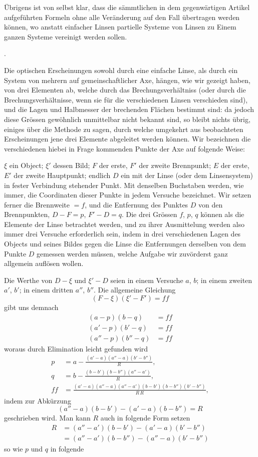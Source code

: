 \documentclass[11pt,a4paper]{article}
\begin{document}
Übrigens ist von selbst klar, dass die sämmtlichen in dem gegenwärtigen Artikel aufgeführten Formeln ohne alle Veränderung auf den Fall übertragen werden können, wo anstatt einfacher Linsen partielle Systeme von Linsen zu Einem ganzen Systeme vereinigt werden sollen.

\bigskip{}.

\smallskip
Die optischen Erscheinungen sowohl durch eine einfache Linse, als durch ein System von mehrern auf gemeinschaftlicher Axe, hängen, wie wir gezeigt haben, von drei Elementen ab, welche durch das Brechungsverhältniss (oder durch die Brechungsverhältnisse, wenn sie für die verschiedenen Linsen verschieden sind), und die Lagen und Halbmesser der brechenden Flächen bestimmt sind: da jedoch diese Grössen gewöhnlich unmittelbar nicht bekannt sind, so bleibt nichts übrig, einiges über die Methode zu sagen, durch welche umgekehrt aus beobachteten Erscheinungen jene drei Elemente abgeleitet werden können. Wir bezeichnen die verschiedenen hiebei in Frage kommenden Punkte der Axe auf folgende Weise:

$\xi$ ein Object; $\xi'$ dessen Bild; $F$ der erste, $F'$ der zweite Brennpunkt; $E$ der erste, $E'$ der zweite Hauptpunkt; endlich $D$ ein mit der Linse (oder dem Linsensystem) in fester Verbindung stehender Punkt. Mit denselben Buchstaben werden, wie immer, die Coordinaten dieser Punkte in jedem Versuche bezeichnet. Wir setzen ferner die Brennweite $= f$, und die Entfernung des Punktes $D$ von den Brennpunkten, $D - F = p$, $F' - D = q$. Die drei Grössen $f$, $p$, $q$ können als die Elemente der Linse betrachtet werden, und zu ihrer Ausmittelung werden also immer drei Versuche erforderlich sein, indem in drei verschiedenen Lagen des Objects und seines Bildes gegen die Linse die Entfernungen derselben von dem Punkte $D$ gemessen werden müssen, welche Aufgabe wir zuvörderst ganz allgemein auflösen wollen.

Die Werthe von $D - \xi$ und $\xi' - D$ seien in einem Versuche $a$, $b$; in einem zweiten $a'$, $b'$; in einem dritten $a''$, $b''$. Die allgemeine Gleichung
\[
(F - \xi)(\xi' - F') = ff
\]
gibt uns demnach
\begin{align*}
(a - p)(b - q) &= ff \\
(a' - p)(b' - q) &= ff \\
(a'' - p)(b'' - q) &= ff
\end{align*}
woraus durch Elimination leicht gefunden wird
\begin{align*}
p &= a - \frac{(a' - a)(a'' - a)(b' - b'')}{R}, \\
q &= b - \frac{(b - b')(b - b'')(a'' - a')}{R}, \\
ff &= \frac{(a' - a)(a'' - a)(a'' - a')(b - b')(b - b'')(b' - b'')}{R\,R},
\end{align*}
indem zur Abkürzung
\[
(a'' - a)(b - b') - (a' - a)(b - b'') = R
\]
geschrieben wird. Man kann $R$ auch in folgende Form setzen
\begin{align*}
R &= (a'' - a')(b - b') - (a' - a)(b' - b'') \\
  &= (a'' - a')(b - b'') - (a'' - a)(b' - b'')
\end{align*}
so wie $p$ und $q$ in folgende
\end{document}
